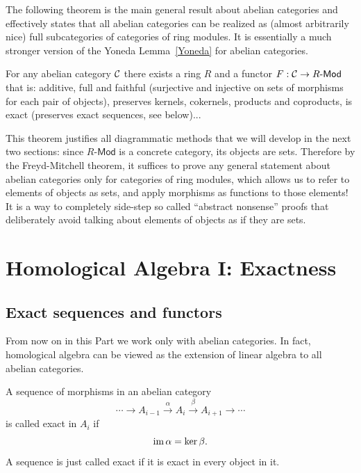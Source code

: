 The following theorem is the main general result about abelian categories and effectively states that all abelian categories can be realized as (almost arbitrarily nice) full subcategories of categories of ring modules. It is essentially a much stronger version of the Yoneda Lemma~\ref{Yoneda} for abelian categories.

\begin{thm}
    For any abelian category $\mathcal{C}$ there exists a ring $R$ and a functor $F:\mathcal{C}\to R\text{-}\mathsf{Mod}$ that is: additive, full and faithful (surjective and injective on sets of morphisms for each pair of objects), preserves kernels, cokernels, products and coproducts, is exact (preserves exact sequences, see below)...
\end{thm}
This theorem justifies all diagrammatic methods that we will develop in the next two sections: since $R\text{-}\mathsf{Mod}$ is a concrete category, its objects are sets. Therefore by the Freyd-Mitchell theorem, it suffices to prove any general statement about abelian categories only for categories of ring modules, which allows us to refer to elements of objects as sets, and apply morphisms as functions to those elements! It is a way to completely side-step so called ``abstract nonsense'' proofs that deliberately avoid talking about elements of objects as if they are sets.






\clearpage
\section{Homological Algebra I: Exactness}

\subsection{Exact sequences and functors}

From now on in this Part we work only with abelian categories. In fact, homological algebra can be viewed as the extension of linear algebra to all abelian categories.

\begin{defn}
    A sequence of morphisms in an abelian category 
    \[\cdots \to A_{i-1}\overset{\alpha}\to A_i\overset{\beta}\to A_{i+1}\to \cdots\]
    is called exact in $A_i$ if 
    \[\operatorname{im}\alpha=\ker\beta.\]
    A sequence is just called exact if it is exact in every object in it.
\end{defn}

